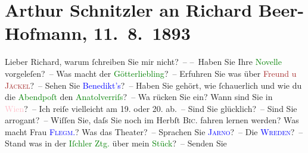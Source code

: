 

               \section[Arthur Schnitzler an Richard Beer-Hofmann, 11. 8. 1893]{ Arthur Schnitzler an Richard Beer-Hofmann, 11. 8. 1893}\nopagebreak{}\rehead{ }\normalsize\beginnumbering{} \toendnotes[C]{\smallbreak\pagebreak[2]} 
\toendnotes[C]{\smallbreak}\pstart
           \noindent{}{\pb}Lieber Richard, warum ſchreiben Sie
               mir nicht? – – Haben Sie Ihre \textcolor{green}{Novelle}{}
               vorgeleſen? – Was macht der \textcolor{green}{Götterliebling}{}\ledrightnote{\textcolor{green}{Der Tod Georgs}}? – Erfuhren Sie was über \textcolor{brown}{Freund u \textsc{Jäckel}}{}? – Sehen Sie \textcolor{blue}{Benedikt’s}{}\ledrightnote{\textcolor{blue}{Marianne Benedict}{\newline}\textcolor{blue}{Markus Benedict}}? – Haben Sie gehört, wie ſchauerlich und wie du{\geminationm} die \textcolor{green}{Abendpoſt}{}\ledrightnote{\textcolor{green}{Wiener Abendpost}} den
                  \textcolor{green}{Anatol}{}\ledrightnote{\textcolor{green}{Anatol}}{ }\textcolor{green}{verriſs}{}? – Wa{\geminationn}
               rücken Sie ein? Wann sind Sie in \textcolor{pink}{Wien}{}\ledrightnote{\textcolor{pink}{Wien}}? – Ich
               reiſe vielleicht am 19. oder 20. ab. – Sind Sie
               glücklich? – Sind Sie arrogant? – Wiſſen Sie, daſs Sie noch im Herbſt \textsc{Bic}. fahren lernen werden? Was macht Frau \textcolor{blue}{\textsc{Flegm}.}{}\ledrightnote{\textcolor{blue}{Bertha Flegmann}}? Was das Theater? – Sprachen Sie
                  \textcolor{blue}{\textsc{Jarno}}{}\ledrightnote{\textcolor{blue}{Josef Jarno}}? – Die \textcolor{blue}{\textsc{Wreden}}{}\ledrightnote{\textcolor{blue}{Grethe Wreden}}? – Stand was in der \textcolor{green}{Iſchler
                  Ztg.}{} über mein \textcolor{green}{Stück}{}? – Senden Sie
